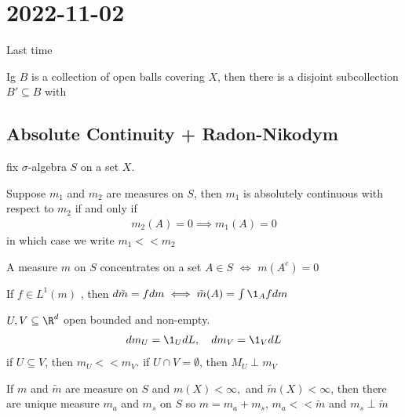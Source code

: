 \section{2022-11-02}

Last time

\begin{theorem}[Vitali]
	Ig $B$ is a collection of open balls covering $X$, then there is a disjoint subcollection $B' \subseteq B$ with 
\end{theorem}


\subsection{Absolute Continuity + Radon-Nikodym}

fix $\sigma$-algebra $S$ on a set $X$.


\begin{definition}
	Suppose $m_1$ and $m_{2}$ are measures on $S$, then $m_1$ is absolutely continuous with respect to $m_{2}$ if and only if 
	\begin{align*}
		m_{2} (A) = 0 \implies m_1 (A) = 0
	\end{align*} in which case we write $m_1 << m_2$
\end{definition}

\begin{definition}
	A measure $m$ on $S$ concentrates on a set $A \in S$ $\iff $ $m(A^{c}) = 0$
\end{definition}

\begin{remark}
	If $f \in L^{1} (m)$ , then $d\tilde{m} = f dm \iff \tilde{m} (A) = \int \1_{A}f dm$
\end{remark}


\begin{example}
	$U, V \subseteq  \R^{d}$ open bounded and non-empty.
	\begin{align*}
		d m_{U} = \1_{U} dL, \quad d m_{V} = \1_{V} dL
	\end{align*} if $U \subseteq V$, then $m_{U} << m_{V}$.
	if $U \cap V = \emptyset$, then $M_{U} \perp m_{V}$
\end{example}

\begin{theorem}
	If $m$ and $\tilde m$ are measure on  $S$ and  $m(X) < \infty,$ and $\tilde m (X) < \infty$, then there are unique measure $m_{a}$ and $m_{s}$ on $S$ so $m = m_{a} + m_{s}$, $m_{a} << \tilde m$ and $m_{s} \perp \tilde m$
\end{theorem}

